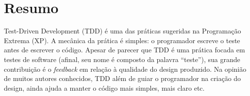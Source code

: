 \documentclass[11pt,openany,twoside,a4paper]{book}
\begin{document}




    
      



\chapter*{Resumo}

Test-Driven Development (TDD) é uma das práticas sugeridas na Programação
Extrema (XP).
A mecânica da prática é simples: o programador escreve o teste antes
de escrever o código. Apesar de parecer que TDD é uma prática focada em testes
de software (afinal, seu nome é composto da palavra ``teste''), sua
grande contribuição é o \textit{feedback} em relação à qualidade do design produzido.
Na opinião de muitos autores conhecidos, TDD além de guiar o programador na
criação do design, ainda ajuda a manter o código mais simples,
mais claro etc.
\end{document}
